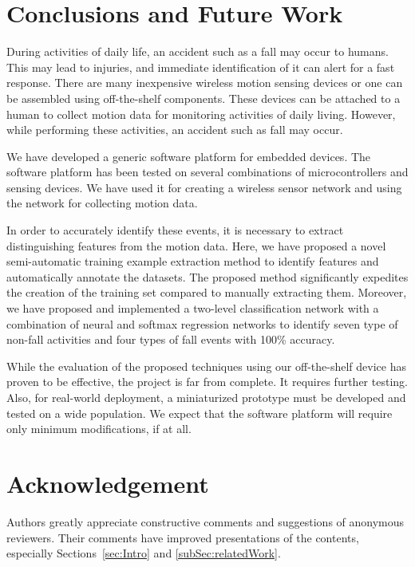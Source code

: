 \documentclass[]{IEEEtran}
\begin{document}
\section{Conclusions and Future Work}
  
During activities of daily life, an accident such as a fall may occur to
humans. This may lead to injuries, and immediate identification of it can alert
for a fast response.  There are many inexpensive wireless motion sensing
devices or one can be assembled using off-the-shelf components. These devices
can be attached to a human to collect motion data for monitoring activities of
daily living. However, while performing these activities, an accident such as
fall may occur.

We have developed a generic software platform for embedded devices. The
software platform has been tested on several combinations of microcontrollers
and sensing devices. We have used it for creating a wireless sensor network and
using the network for collecting motion data.

In order to accurately identify these events, it is necessary to extract
distinguishing features from the motion data. Here, we have proposed a novel
semi-automatic training example extraction method to identify features and
automatically annotate the datasets. The proposed method significantly
expedites the creation of the training set compared to manually extracting
them. Moreover, we have proposed and implemented a two-level classification
network with  a combination of neural and softmax regression networks to
identify seven type of non-fall activities and four types of fall events with
100\% accuracy. 

While the evaluation of the proposed techniques using our off-the-shelf device
has proven to be effective, the project is far from complete. It requires
further testing. Also, for real-world deployment, a miniaturized prototype must
be developed and tested on a wide population. We expect that the software
platform will require only minimum modifications, if at all.
\section*{Acknowledgement} \label{sec:Acknowledgement} Authors greatly
appreciate  constructive comments and suggestions of anonymous reviewers. Their
comments have improved presentations of the contents, especially Sections~\ref{sec:Intro} and \ref{subSec:relatedWork}.




\end{document}
